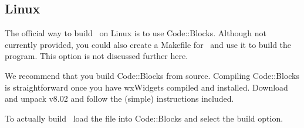 \subsection{Linux}

The official way to build \MapEditor\ on Linux is to use Code::Blocks. Although not currently provided, you could also create a Makefile for \MapEditor\ and use it to build the program. This option is not discussed further here.

We recommend that you build Code::Blocks from source. Compiling Code::Blocks is straightforward once you have wxWidgets compiled and installed. Download and unpack v8.02 and follow the (simple) instructions included.

To actually build \MapEditor\ load the  file into Code::Blocks and select the build option.
